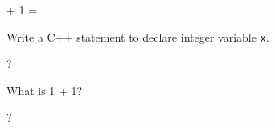 

\renewcommand\AUTHOR{jdoe5@cougars.ccis.edu} %


\topmattertwo

 + 1 = 

\nextq
Write a C++ statement to declare integer variable \verb!x!.
\\
\ANSWER
\begin{answercode}
?
\end{answercode}

\nextq
What is 1 + 1?
\\
\ANSWER
\begin{answerlong}
?
\end{answerlong}

\newpage

